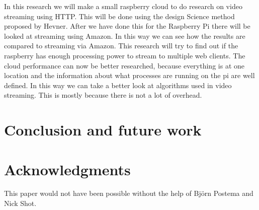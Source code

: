 \documentclass{sig-alternate-br}
\begin{document}
In this research we will make a small raspberry cloud to do research on video streaming using HTTP. This will be done using the design Science method proposed by Hevner\cite{hevner:2007}. After we have done this for the Raspberry Pi there will be looked at streaming using Amazon. In this way we can see how the results are compared to streaming via Amazon. This research will try to find out if the raspberry has enough processing power to stream to multiple web clients. The cloud performance can now be better researched, because everything is at one location and the information about what processes are running on the pi are well defined. In this way we can take a better look at algorithms used in video streaming. This is mostly because there is not a lot of overhead. 

\section{Conclusion and future work}

\section{Acknowledgments}
This paper would not have been possible without the help of Björn Postema and Nick Shot.


%
%
\vspace{50 mm}
\newpage
\end{document}
